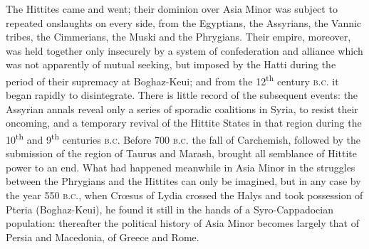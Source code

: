 \documentclass[a4paper, 11pt, oneside, polutonikogreek, english]{article}
\begin{document}
The Hittites came and went; their dominion over Asia Minor was subject to repeated onslaughts on every side, from the Egyptians, the Assyrians, the Vannic tribes, the Cimmerians, the Muski and the Phrygians. Their empire, moreover, was held together only insecurely by a system of confederation and alliance which was not apparently of mutual seeking, but imposed by the Hatti during the period of their supremacy at Boghaz-Keui; and from the 12\textsuperscript{th} century \textsc{b.c.} it began rapidly to disintegrate. There is little record of the subsequent events: the Assyrian annals reveal only a series of sporadic coalitions in Syria, to resist their oncoming, and a temporary revival of the Hittite States in that region during the 10\textsuperscript{th} and 9\textsuperscript{th} centuries \textsc{b.c.} Before 700 \textsc{b.c.} the fall of Carchemish, followed by the submission of the region of Taurus and Marash, brought all semblance of Hittite power to an end. What had happened meanwhile in Asia Minor in the struggles between the Phrygians and the Hittites can only be imagined, but in any case by the year 550 \textsc{b.c.}, when Crœsus of Lydia crossed the Halys and took possession of Pteria (Boghaz-Keui), he found it still in the hands of a Syro-Cappadocian population: thereafter the political history of Asia Minor becomes largely that of Persia and Macedonia, of Greece and Rome.
\end{document}
